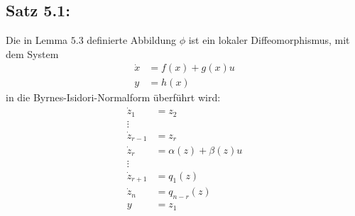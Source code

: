 \documentclass[ngerman]{tudscrreprt}
\begin{document}
\subsection*{Satz 5.1:} Die in Lemma $5.3$ definierte Abbildung $\phi$ ist ein lokaler Diffeomorphismus, mit dem System 
\begin{align*}
\dot x &= f(x) + g(x) u\\ 
y &= h(x) \tag{5.1}
\end{align*}
in die Byrnes-Isidori-Normalform überführt wird:
\begin{align*}
\dot z_1 &= z_2\\ 
\vdots &\\ 
\dot z_{r-1} &= z_r\\ 
\dot z_r &= \alpha(z) + \beta(z)u\\ 
\vdots\\
\dot z_{r+1} &= q_1(z)\\
\dot z_n &= q_{n-r}(z)\\ 
y  &= z_1 \tag{5.10}
\end{align*}
\end{document}
